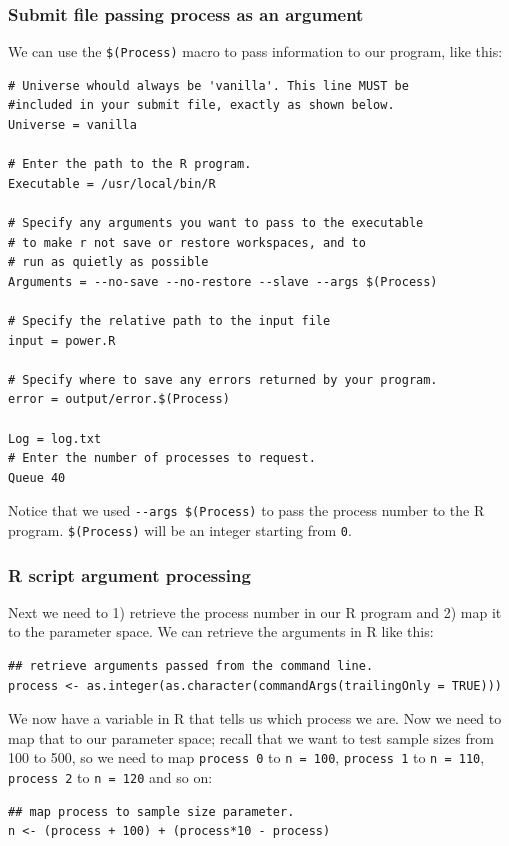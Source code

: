 \documentclass[11pt]{article}
\begin{document}
\subsubsection{Submit file passing process as an argument}
\label{sec-7-4-1}
We can use the \texttt{\$(Process)} macro to pass information to our program, like this:
\begin{verbatim}
# Universe whould always be 'vanilla'. This line MUST be 
#included in your submit file, exactly as shown below.
Universe = vanilla

# Enter the path to the R program.
Executable = /usr/local/bin/R

# Specify any arguments you want to pass to the executable
# to make r not save or restore workspaces, and to 
# run as quietly as possible
Arguments = --no-save --no-restore --slave --args $(Process)

# Specify the relative path to the input file
input = power.R

# Specify where to save any errors returned by your program.
error = output/error.$(Process)

Log = log.txt
# Enter the number of processes to request.
Queue 40
\end{verbatim}
Notice that we used \texttt{-{}-args \$(Process)} to pass the process number to the R program. \texttt{\$(Process)} will be an integer starting from \texttt{0}. 

\subsubsection{R script argument processing}
\label{sec-7-4-2}
Next we need to 1) retrieve the process number in our R program and 2) map it to the parameter space. We can retrieve the arguments in R like this:
\begin{verbatim}
## retrieve arguments passed from the command line.
process <- as.integer(as.character(commandArgs(trailingOnly = TRUE)))
\end{verbatim}
We now have a variable in R that tells us which process we are. Now we need to map that to our parameter space; recall that we want to test sample sizes from 100 to 500, so we need to map \texttt{process 0} to \texttt{n = 100},  \texttt{process 1} to \texttt{n = 110}, \texttt{process 2} to \texttt{n = 120} and so on:
\begin{verbatim}
## map process to sample size parameter.
n <- (process + 100) + (process*10 - process)
\end{verbatim}
\end{document}
